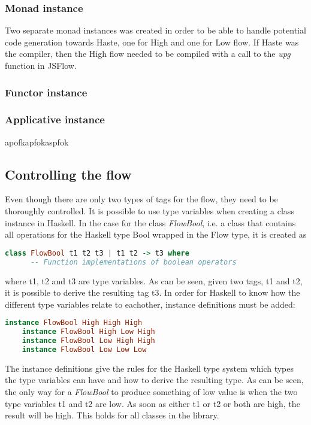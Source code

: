 \subsubsection{Monad instance}
Two separate monad instances was created in order to be able to handle potential code generation towards Haste, one for High and one for Low flow. If Haste was the compiler, then the High flow needed to be compiled with a call to the \emph{upg} function in JSFlow.

\subsubsection{Functor instance}

\subsubsection{Applicative instance}
apofkapfokaspfok

\subsection{Controlling the flow}
Even though there are only two types of tags for the flow, they need to be thoroughly controlled. It is possible to use type variables when creating a class instance in Haskell. In the case for the class \emph{FlowBool}, i.e. a class that contains all operations for the Haskell type Bool wrapped in the Flow type, it is created as
\begin{center}
  \begin{lstlisting}[language=Haskell]
    class FlowBool t1 t2 t3 | t1 t2 -> t3 where
      -- Function implementations of boolean operators
  \end{lstlisting}
\end{center}
where t1, t2 and t3 are type variables. As can be seen, given two tags, t1 and t2, it is possible to derive the resulting tag t3. In order for Haskell to know how the different type variables relate to eachother, instance definitions must be added:
\begin{center}
  \begin{lstlisting}[language=Haskell]
    instance FlowBool High High High
    instance FlowBool High Low High
    instance FlowBool Low High High
    instance FlowBool Low Low Low
  \end{lstlisting}
\end{center}
The instance definitions give the rules for the Haskell type system which types the type variables can have and how to derive the resulting type. As can be seen, the only way for a \emph{FlowBool} to produce something of low value is when the two type variables t1 and t2 are low. As soon as either t1 or t2 or both are high, the result will be high. This holds for all classes in the library.

